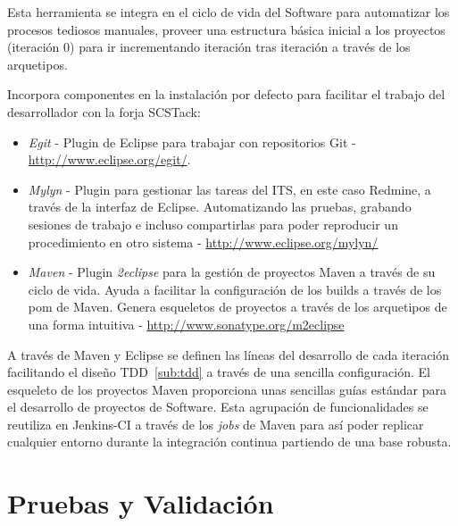 \par Esta herramienta se integra en el ciclo de vida del Software para automatizar los procesos tediosos manuales, proveer una estructura básica inicial a los proyectos (iteración 0) para ir incrementando iteración tras iteración a través de los arquetipos.

\par Incorpora componentes en la instalación por defecto para facilitar el trabajo del desarrollador con la forja SCSTack:

\begin{itemize}
	\item \emph{Egit} - Plugin de Eclipse para trabajar con repositorios Git - \url{http://www.eclipse.org/egit/}.
	\item \emph{Mylyn} - Plugin para gestionar las tareas del ITS, en este caso Redmine, a través de la interfaz de Eclipse. Automatizando las pruebas, grabando sesiones de trabajo e incluso compartirlas para poder reproducir un procedimiento en otro sistema - \url{http://www.eclipse.org/mylyn/}
	\item \emph{Maven} - Plugin \emph{2eclipse} para la gestión de proyectos Maven a través de su ciclo de vida. Ayuda a facilitar la configuración de los builds a través de los pom de Maven. Genera esqueletos de proyectos a través de los arquetipos de una forma intuitiva - \url{http://www.sonatype.org/m2eclipse}
\end{itemize}

\par A través de Maven y Eclipse se definen las líneas del desarrollo de cada iteración facilitando el diseño TDD~\ref{sub:tdd} a través de una sencilla configuración. El esqueleto de los proyectos Maven proporciona unas sencillas guías estándar para el desarrollo de proyectos de Software. Esta agrupación de funcionalidades se reutiliza en Jenkins-CI a través de los \emph{jobs} de Maven para así poder replicar cualquier entorno durante la integración continua partiendo de una base robusta.



\section{Pruebas y Validación}
\label{sec:pruebas-validacion}

